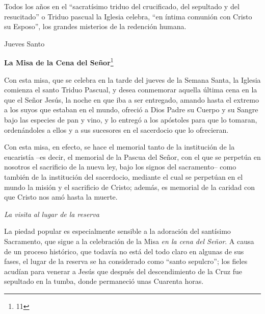 			\begin{bodyintro}Todos los años en el “sacratísimo triduo del crucificado, del sepultado y del resucitado” o Triduo pascual la Iglesia celebra, “en íntima comunión con Cristo su Esposo”, los grandes misterios de la redención humana.\end{bodyintro}
			
			\begin{bodyintro}\begin{introsubsection}Jueves Santo\end{introsubsection} \end{bodyintro}
			
			\begin{bodyintro}\textbf{La Misa de la Cena del Señor}\footnote{11}\end{bodyintro}
			
			\begin{bodyintro}Con esta misa, que se celebra en la tarde del jueves de la Semana Santa, la Iglesia comienza el santo Triduo Pascual, y desea conmemorar aquella última cena en la que el Señor Jesús, la noche en que iba a ser entregado, amando hasta el extremo a los suyos que estaban en el mundo, ofreció a Dios Padre su Cuerpo y su Sangre bajo las especies de pan y vino, y lo entregó a los apóstoles para que lo tomaran, ordenándoles a ellos y a sus sucesores en el sacerdocio que lo ofrecieran.\end{bodyintro}
			
			\begin{bodyintro}Con esta misa, en efecto, se hace el memorial tanto de la institución de la eucaristía –es decir, el memorial de la Pascua del Señor, con el que se perpetúa en nosotros el sacrificio de la nueva ley, bajo los signos del sacramento– como también de la institución del sacerdocio, mediante el cual se perpetúan en el mundo la misión y el sacrificio de Cristo; además, es memorial de la caridad con que Cristo nos amó hasta la muerte. \end{bodyintro}
			
			\begin{bodyintro}\textit{La visita al lugar de la reserva}\end{bodyintro}
			
			\begin{bodyintro}La piedad popular es especialmente sensible a la adoración del santísimo Sacramento, que sigue a la celebración de la Misa \textit{en la cena del Señor}. A causa de un proceso histórico, que todavía no está del todo claro en algunas de sus fases, el lugar de la reserva se ha considerado como “santo sepulcro”; los fieles acudían para venerar a Jesús que después del descendimiento de la Cruz fue sepultado en la tumba, donde permaneció unas Cuarenta horas.\end{bodyintro}
			
